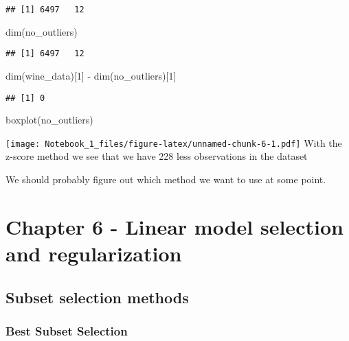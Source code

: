 \documentclass[
]{article}
\newenvironment{Shaded}{\begin{snugshade}}{\end{snugshade}}
\newcommand{\DecValTok}[1]{\textcolor[rgb]{0.00,0.00,0.81}{#1}}
\newcommand{\FunctionTok}[1]{\textcolor[rgb]{0.00,0.00,0.00}{#1}}
\newcommand{\NormalTok}[1]{#1}
\newcommand{\SpecialCharTok}[1]{\textcolor[rgb]{0.00,0.00,0.00}{#1}}
\begin{document}
\begin{verbatim}
## [1] 6497   12
\end{verbatim}

\begin{Shaded}
\begin{Highlighting}[]
\FunctionTok{dim}\NormalTok{(no\_outliers)}
\end{Highlighting}
\end{Shaded}

\begin{verbatim}
## [1] 6497   12
\end{verbatim}

\begin{Shaded}
\begin{Highlighting}[]
\FunctionTok{dim}\NormalTok{(wine\_data)[}\DecValTok{1}\NormalTok{] }\SpecialCharTok{{-}} \FunctionTok{dim}\NormalTok{(no\_outliers)[}\DecValTok{1}\NormalTok{]}
\end{Highlighting}
\end{Shaded}

\begin{verbatim}
## [1] 0
\end{verbatim}

\begin{Shaded}
\begin{Highlighting}[]
\FunctionTok{boxplot}\NormalTok{(no\_outliers)}
\end{Highlighting}
\end{Shaded}

\texttt{[image: Notebook\_1\_files/figure-latex/unnamed-chunk-6-1.pdf]}
With the z-score method we see that we have 228 less observations in the
dataset

We should probably figure out which method we want to use at some point.

\hypertarget{chapter-6---linear-model-selection-and-regularization}{%
\section{Chapter 6 - Linear model selection and
regularization}\label{chapter-6---linear-model-selection-and-regularization}}

\hypertarget{subset-selection-methods}{%
\subsection{Subset selection methods}\label{subset-selection-methods}}

\hypertarget{best-subset-selection}{%
\subsubsection{Best Subset Selection}\label{best-subset-selection}}
\end{document}
